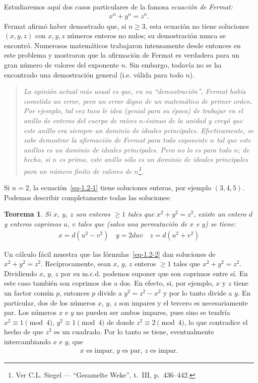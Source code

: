 \documentclass[bibtotoc,leqno,spanish]{amsbook}
\numberwithin{equation}{section}
\newenvironment{comm}%
	{\begin{quotation}\itshape\Small}
	{\end{quotation}}
\theoremstyle{note}
\theoremstyle{note}
\newtheorem{theorem}{Teorema}
\theoremstyle{rem}
\numberwithin{theorem}{section}
\numberwithin{proposition}{section}
\numberwithin{definition}{section}
\numberwithin{lemma}{section}
\numberwithin{corollary}{section}
\numberwithin{example}{section}
\numberwithin{footnote}{section}%
\begin{document}
Estudiaremos aqu\'i dos casos particulares de la famosa {\em ecuaci\'on de Fermat:}
\begin{gather}\label{eq-1.2-1}
x^{n}+y^{n} = z^{n}.
\end{gather}
Fermat afirm\'o haber demostrado que, si $n\geq 3$, esta ecuaci\'on no tiene soluciones
$(x,y,z)$ con $x,y,z$ n\'umeros enteros no nulos; su demostraci\'on nunca se encontr\'o.
Numerosos matem\'aticos trabajaron intensamente desde entonces en este problema y mostraron
que la afirmaci\'on de Fermat es verdadera para un gran n\'umero de valores del exponente $n$.
Sin embargo, todav\'ia no se ha encontrado una demostraci\'on general (i.e. v\'alida para
todo $n$).

\begin{comm}
La opini\'on actual m\'as usual es que, en su ``demostraci\'on'', Fermat hab\'ia cometido
un error, pero un error digno de un matem\'atico de primer orden. Por ejemplo, tal vez
tuvo le idea (genial para su \'epoca) de trabajar en el anillo de enteros del cuerpo de
ra\'ices $n$-\'esimas de la unidad y crey\'o que este anillo era siempre un dominio de ideales
principales. Efectivamente, se sabe demostrar la afirmaci\'on de Fermat para todo exponente $n$
tal que este anillos es un dominio de ideales principales. Pero no lo es para todo $n$;
de hecho,
si $n$ es primo, este anillo s\'olo es un dominio de ideales principales para un n\'umero
finito de valores de $n$\footnote{Ver C.L. Siegel --- ``Gesamelte Weke'', t.~III, p.~436--442.}.
\end{comm}

Si $n=2$, la ecuaci\'on~\eqref{eq-1.2-1} tiene soluciones enteras, por
ejemplo $(3,4,5)$. Podemos describir completamente todas las soluciones:

\begin{theorem}\label{teo1.2.1}
Si $x$, $y$, $z$ son enteros $\geq 1$ tales que $x^{2}+y^{2}=z^{2}$, existe un entero
$d$ y enteros coprimos $u$, $v$ tales que (salvo una permutaci\'on de $x$ e $y$) se tiene:
\begin{gather}\label{eq-1.2-2}
x = d(u^{2}-v^{2})\quad y = 2duv\quad z = d(u^{2}+v^{2})
\end{gather}
\end{theorem}

Un c\'alculo f\'acil muestra que las f\'ormulas~\eqref{eq-1.2-2} dan soluciones
de $x^{2}+y^{2}=z^{2}$.
Rec\'iprocamente, sean $x$, $y$, $z$ enteros $\geq 1$ tales que $x^{2}+y^{2}=z^{2}$. Dividiendo
$x$, $y$, $z$ por su m.c.d. podemos suponer que son coprimos entre s\'i. En este caso tambi\'en
son coprimos dos a dos. En efecto, si, por ejemplo, $x$ y $z$ tiene un factor com\'un $p$, entonces
$p$ divide a $y^{2} = z^{2}-x^{2}$ y por lo tanto divide a $y$. En particular, dos de
los n\'umeros
$x$, $y$, $z$ son impares y el tercero es necesariamente par. Los n\'umeros $x$ e $y$ no
pueden ser ambos impares, pues sino se tendr\'ia $x^{2}\equiv 1\pmod 4$, $y^{2}\equiv 1\pmod 4$
de donde $z^{2}\equiv 2\pmod 4$, lo que contradice el hecho de que $z^{2}$ es un cuadrado.
Por lo tanto se tiene, eventualmente intercambiando $x$ e $y$, que
\begin{gather}\label{eq-1.2-3}
\text{$x$ es impar, $y$ es par, $z$ es impar.}
\end{gather}
\end{document}
